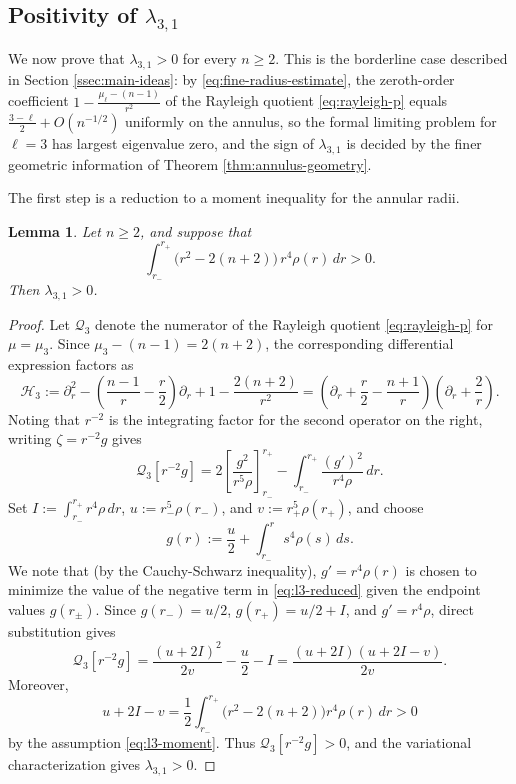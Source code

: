 \documentclass[11pt]{article}
\numberwithin{equation}{section}
\newtheorem{lemma}[theorem]{Lemma}
\theoremstyle{definition}
\begin{document}
\subsection{Positivity of $\lambda_{3,1}$}\label{ssec:l3}



We now prove that $\lambda_{3,1}>0$ for every $n\geq2$. This is the borderline case described in Section \ref{ssec:main-ideas}: by \eqref{eq:fine-radius-estimate}, the zeroth-order coefficient $1-\frac{\mu_\ell-(n-1)}{r^2}$ of the Rayleigh quotient \eqref{eq:rayleigh-p} equals $\frac{3-\ell}{2}+O(n^{-1/2})$ uniformly on the annulus, so the formal limiting problem for $\ell=3$ has largest eigenvalue zero, and the sign of $\lambda_{3,1}$ is decided by the finer geometric information of Theorem \ref{thm:annulus-geometry}.

The first step is a reduction to a moment inequality for the annular radii.


\begin{lemma}\label{lem:l3-moment}
Let $n\geq2$, and suppose that
\begin{equation}\label{eq:l3-moment}
    \int_{r_-}^{r_+}\bigl(r^2-2(n+2)\bigr)\,r^4\rho(r)\,dr>0 .
\end{equation}
Then $\lambda_{3,1}>0$.
\end{lemma}

\begin{proof}
Let $\mathcal Q_3$ denote the numerator of the Rayleigh quotient \eqref{eq:rayleigh-p} for
$\mu=\mu_3$. Since $\mu_3-(n-1)=2(n+2)$, the corresponding differential
expression factors as
\[
    \mathscr H_3:=\partial_r^2 -\left(\frac{n-1}{r}-\frac r2\right)\partial_r
    +1-\frac{2(n+2)}{r^2}
    =
    \left(\partial_r+\frac r2-\frac{n+1}{r}\right)
    \left(\partial_r+\frac2r\right).
\]
Noting that $r^{-2}$ is the integrating factor for the second operator on the right, writing $\zeta=r^{-2}g$ gives
\begin{equation} \label{eq:l3-reduced}
    \mathcal Q_3[r^{-2}g]
    =2\left[\frac{g^2}{r^5\rho}\right]_{r_-}^{r_+}
    -\int_{r_-}^{r_+}\frac{(g')^2}{r^4\rho}\,dr .
\end{equation}
Set $I:=\int_{r_-}^{r_+}r^4\rho\,dr$, $u:=r_-^5\rho(r_-)$, and
$v:=r_+^5\rho(r_+)$, and choose
\[
    g(r):=\frac u2+\int_{r_-}^r s^4\rho(s)\,ds.
\]
We note that (by the Cauchy-Schwarz inequality), $g'=r^4\rho(r)$ is chosen to minimize the value of the negative term in \eqref{eq:l3-reduced} given the endpoint values $g(r_{\pm})$.
Since $g(r_-)=u/2$, $g(r_+)=u/2+I$, and $g'=r^4\rho$, direct substitution
gives
\[
    \mathcal Q_3[r^{-2}g]
    =\frac{(u+2I)^2}{2v}-\frac u2-I
    =\frac{(u+2I)(u+2I-v)}{2v}.
\]
Moreover,
\[
    u+2I-v
    =\frac12\int_{r_-}^{r_+}
       \bigl(r^2-2(n+2)\bigr)r^4\rho(r)\,dr>0
\]
by the assumption \eqref{eq:l3-moment}. Thus $\mathcal Q_3[r^{-2}g]>0$, and the variational
characterization gives $\lambda_{3,1}>0$.
\end{proof}
\end{document}
